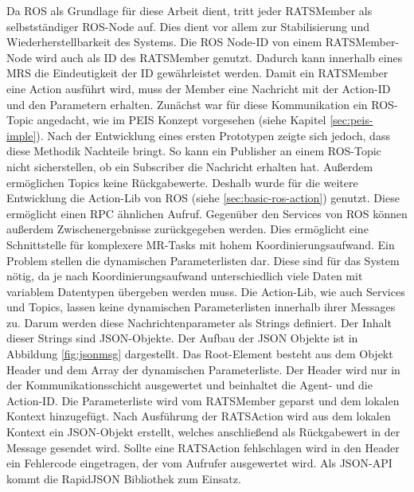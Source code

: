 Da ROS als Grundlage für diese Arbeit dient, tritt jeder RATSMember als selbstständiger ROS-Node auf. Dies dient vor allem zur Stabilisierung und Wiederherstellbarkeit des Systems. Die ROS Node-ID von einem RATSMember-Node wird auch als ID des RATSMember genutzt. Dadurch kann innerhalb eines MRS die Eindeutigkeit der ID gewährleistet werden. Damit ein RATSMember eine Action ausführt wird, muss der Member eine Nachricht mit der Action-ID und den Parametern erhalten. Zunächst war für diese Kommunikation ein ROS-Topic angedacht, wie im PEIS Konzept vorgesehen (siehe Kapitel \ref{sec:peis-imple}). Nach der Entwicklung eines ersten Prototypen zeigte sich jedoch, dass diese Methodik Nachteile bringt. So kann ein Publisher an einem ROS-Topic nicht sicherstellen, ob ein Subscriber die Nachricht erhalten hat. Außerdem ermöglichen Topics keine Rückgabewerte. Deshalb wurde für die weitere Entwicklung die Action-Lib von ROS (siehe \ref{sec:basic-ros-action}) genutzt. Diese ermöglicht einen RPC ähnlichen Aufruf. Gegenüber den Services von ROS können außerdem Zwischenergebnisse zurückgegeben werden. Dies ermöglicht eine Schnittstelle für komplexere MR-Tasks mit hohem Koordinierungsaufwand. Ein Problem stellen die dynamischen Parameterlisten dar. Diese sind für das System nötig, da je nach Koordinierungsaufwand unterschiedlich viele Daten mit variablem Datentypen übergeben werden muss. Die Action-Lib, wie auch Services und Topics, lassen keine dynamischen Parameterlisten innerhalb ihrer Messages zu. Darum werden diese Nachrichtenparameter als Strings definiert. Der Inhalt dieser Strings sind JSON-Objekte. Der Aufbau der JSON Objekte ist in Abbildung \ref{fig:jsonmsg} dargestellt. Das Root-Element besteht aus dem Objekt Header und dem Array der dynamischen Parameterliste. Der Header wird nur in der Kommunikationsschicht ausgewertet und beinhaltet die Agent- und die Action-ID. Die Parameterliste wird vom RATSMember geparst und dem lokalen Kontext hinzugefügt. Nach Ausführung der RATSAction wird aus dem lokalen Kontext ein JSON-Objekt erstellt, welches anschließend als Rückgabewert in der Message gesendet wird. Sollte eine RATSAction fehlschlagen wird in den Header ein Fehlercode eingetragen, der vom Aufrufer ausgewertet wird. Als JSON-API kommt die RapidJSON Bibliothek zum Einsatz.

